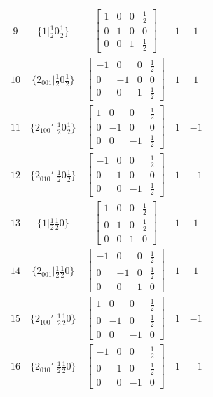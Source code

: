 \documentclass[fleqn,8pt]{jsarticle}
\begin{document}
\begin{longtable}{ccccc}
$ 9 $ & $ \{1|\frac{1}{2} 0 \frac{1}{2}\} $ & $ \begin{bmatrix} 1 & 0 & 0 & \frac{1}{2} \\ 0 & 1 & 0 & 0 \\ 0 & 0 & 1 & \frac{1}{2} \end{bmatrix} $ & $ 1 $ & $ 1 $ \\ \hline
$ 10 $ & $ \{2{}_{001}|\frac{1}{2} 0 \frac{1}{2}\} $ & $ \begin{bmatrix} -1 & 0 & 0 & \frac{1}{2} \\ 0 & -1 & 0 & 0 \\ 0 & 0 & 1 & \frac{1}{2} \end{bmatrix} $ & $ 1 $ & $ 1 $ \\ \hline
$ 11 $ & $ \{2{}_{100}{}'|\frac{1}{2} 0 \frac{1}{2}\} $ & $ \begin{bmatrix} 1 & 0 & 0 & \frac{1}{2} \\ 0 & -1 & 0 & 0 \\ 0 & 0 & -1 & \frac{1}{2} \end{bmatrix} $ & $ 1 $ & $ -1 $ \\ \hline
$ 12 $ & $ \{2{}_{010}{}'|\frac{1}{2} 0 \frac{1}{2}\} $ & $ \begin{bmatrix} -1 & 0 & 0 & \frac{1}{2} \\ 0 & 1 & 0 & 0 \\ 0 & 0 & -1 & \frac{1}{2} \end{bmatrix} $ & $ 1 $ & $ -1 $ \\ \hline
$ 13 $ & $ \{1|\frac{1}{2} \frac{1}{2} 0\} $ & $ \begin{bmatrix} 1 & 0 & 0 & \frac{1}{2} \\ 0 & 1 & 0 & \frac{1}{2} \\ 0 & 0 & 1 & 0 \end{bmatrix} $ & $ 1 $ & $ 1 $ \\ \hline
$ 14 $ & $ \{2{}_{001}|\frac{1}{2} \frac{1}{2} 0\} $ & $ \begin{bmatrix} -1 & 0 & 0 & \frac{1}{2} \\ 0 & -1 & 0 & \frac{1}{2} \\ 0 & 0 & 1 & 0 \end{bmatrix} $ & $ 1 $ & $ 1 $ \\ \hline
$ 15 $ & $ \{2{}_{100}{}'|\frac{1}{2} \frac{1}{2} 0\} $ & $ \begin{bmatrix} 1 & 0 & 0 & \frac{1}{2} \\ 0 & -1 & 0 & \frac{1}{2} \\ 0 & 0 & -1 & 0 \end{bmatrix} $ & $ 1 $ & $ -1 $ \\ \hline
$ 16 $ & $ \{2{}_{010}{}'|\frac{1}{2} \frac{1}{2} 0\} $ & $ \begin{bmatrix} -1 & 0 & 0 & \frac{1}{2} \\ 0 & 1 & 0 & \frac{1}{2} \\ 0 & 0 & -1 & 0 \end{bmatrix} $ & $ 1 $ & $ -1 $ \\
\end{longtable}
\end{document}
